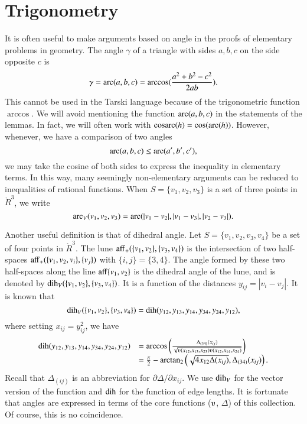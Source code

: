 \section{Trigonometry}
\label{sec:trig}


It is often useful to make arguments based on angle in the proofs
of elementary problems in geometry. The angle $\gamma$
of a triangle with sides
$a,b,c$ on the side opposite $c$ is
    $$
    \gamma = \operatorname{arc}(a,b,c)=\arccos(\frac{a^2 + b^2 - c^2}{2 a b}).
    $$
This cannot be used in the Tarski language because of the trigonometric
function $\arccos$.  We will avoid mentioning the function
$\operatorname{arc}(a,b,c)$ in the statements of the lemmas.
In fact, we will often work with $\operatorname{cosarc}(h) = \cos(\operatorname{arc}(h))$.
However, whenever, we have a comparison of
two angles
    $$
    \operatorname{arc}(a,b,c) \le \operatorname{arc}(a',b',c'),
    $$
we may take the cosine of both sides to express the inequality in
elementary terms.  In this way, many seemingly non-elementary arguments
can be reduced to inequalities of rational functions.  When
$S=\{v_1,v_2,v_3\}$ is a set of three points in $\ring{R}^3$, we write
   $$
   \operatorname{arc}_V(v_1,v_2,v_3) = \operatorname{arc}(|v_1-v_2|,|v_1-v_3|,|v_2-v_3|).
   $$

Another useful definition is that of dihedral angle.  Let 
$S=\{v_1,v_2,v_3,v_4\}$ be a set of four points in $\ring{R}^3$.
The lune ${\operatorname{aff}}_+(\{v_1,v_2\},\{v_3,v_4\})$ is the intersection
of two half-spaces ${\operatorname{aff}}_+(\{v_1,v_2,v_i\},\{v_j\})$ with
$\{i,j\}=\{3,4\}$.  The angle formed by these two half-spaces along
the line ${\operatorname{aff}}\{v_1,v_2\}$ is the dihedral angle of the lune,
and is denoted by $\operatorname{dih}_V(\{v_1,v_2\},\{v_3,v_4\})$.  It is a function
of the distances $y_{ij} = |v_i-v_j|$.  It is known that
 $$
 \operatorname{dih}_V(\{v_1,v_2\},\{v_3,v_4\}) = 
  \operatorname{dih}(y_{12},y_{13},y_{14},y_{34},y_{24},y_{12}),
 $$
where setting $x_{ij}=y_{ij}^2$, we have
 $$\begin{array}{lll}
  \dih(y_{12},y_{13},y_{14},y_{34},y_{24},y_{12}) &=
  \arccos\left(\frac{\Delta_{(34)}(x_{ij})}{\sqrt{
    \ups(x_{12},x_{13},x_{23})\ups(x_{12},x_{14},x_{24})}}\right)\\
    &=\frac{\pi}{2} - \atn
     \left({\sqrt{4 x_{12} \Delta(x_{ij})}},{\Delta_{(34)}(x_{ij})}\right).
  \end{array} 
 $$
Recall that $\Delta_{(ij)}$ is an abbreviation for 
$\partial\Delta/\partial x_{ij}$.  We use $\operatorname{dih}_V$ for the
vector version of the function and $\operatorname{dih}$ for the function of
edge lengths.
It is fortunate that angles are expressed in terms of the 
core functions ($\ups$, $\Delta$) of this collection.  Of course,
this is no coincidence.



